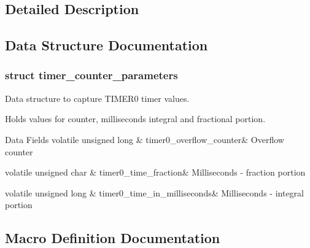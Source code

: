 \subsection{Detailed Description}


\subsection{Data Structure Documentation}
\label{structtimer__counter__parameters}
\hypertarget{group__custom__timer_structtimer__counter__parameters}{}
\subsubsection{struct timer\+\_\+counter\+\_\+parameters}
Data structure to capture T\+I\+M\+E\+R0 timer values. 

Holds values for counter, milliseconds integral and fractional portion. \begin{DoxyFields}{Data Fields}
volatile unsigned long\hypertarget{group__custom__timer_aa79fe04dffebb2f4e695277add2e16b7}{}\label{group__custom__timer_aa79fe04dffebb2f4e695277add2e16b7}
&
timer0\+\_\+overflow\+\_\+counter&
Overflow counter \\
\hline

volatile unsigned char\hypertarget{group__custom__timer_a7e8e857b338dddf471cd54d28f6a20d4}{}\label{group__custom__timer_a7e8e857b338dddf471cd54d28f6a20d4}
&
timer0\+\_\+time\+\_\+fraction&
Milliseconds -\/ fraction portion \\
\hline

volatile unsigned long\hypertarget{group__custom__timer_acafda81d824aaccff5e5b4cea914f4d7}{}\label{group__custom__timer_acafda81d824aaccff5e5b4cea914f4d7}
&
timer0\+\_\+time\+\_\+in\+\_\+milliseconds&
Milliseconds -\/ integral portion \\
\hline

\end{DoxyFields}


\subsection{Macro Definition Documentation}
